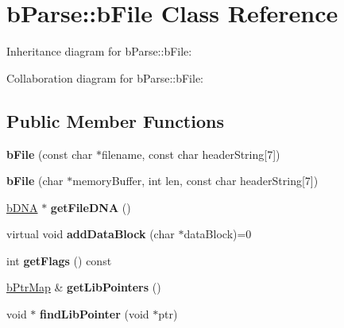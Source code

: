 \hypertarget{classb_parse_1_1b_file}{\section{b\+Parse\+:\+:b\+File Class Reference}
\label{classb_parse_1_1b_file}
}


Inheritance diagram for b\+Parse\+:\+:b\+File\+:


Collaboration diagram for b\+Parse\+:\+:b\+File\+:
\subsection*{Public Member Functions}
\begin{DoxyCompactItemize}
\item 
\hypertarget{classb_parse_1_1b_file_a01b52b96559d09b6f485a2b6b30a7c35}{{\bfseries b\+File} (const char $\ast$filename, const char header\+String\mbox{[}7\mbox{]})}\label{classb_parse_1_1b_file_a01b52b96559d09b6f485a2b6b30a7c35}

\item 
\hypertarget{classb_parse_1_1b_file_a152c5119d0f19103820b67590367179c}{{\bfseries b\+File} (char $\ast$memory\+Buffer, int len, const char header\+String\mbox{[}7\mbox{]})}\label{classb_parse_1_1b_file_a152c5119d0f19103820b67590367179c}

\item 
\hypertarget{classb_parse_1_1b_file_ac452173b4b97b77a6557f1df03fe17c4}{\hyperlink{classb_parse_1_1b_d_n_a}{b\+D\+N\+A} $\ast$ {\bfseries get\+File\+D\+N\+A} ()}\label{classb_parse_1_1b_file_ac452173b4b97b77a6557f1df03fe17c4}

\item 
\hypertarget{classb_parse_1_1b_file_a20874bc488319e12f6f35ae4a912900b}{virtual void {\bfseries add\+Data\+Block} (char $\ast$data\+Block)=0}\label{classb_parse_1_1b_file_a20874bc488319e12f6f35ae4a912900b}

\item 
\hypertarget{classb_parse_1_1b_file_a02d2b991e11791c26c394f1812d30cb7}{int {\bfseries get\+Flags} () const }\label{classb_parse_1_1b_file_a02d2b991e11791c26c394f1812d30cb7}

\item 
\hypertarget{classb_parse_1_1b_file_af57165d68bfb0faad353ae0f3d64b8e3}{\hyperlink{classbt_hash_map}{b\+Ptr\+Map} \& {\bfseries get\+Lib\+Pointers} ()}\label{classb_parse_1_1b_file_af57165d68bfb0faad353ae0f3d64b8e3}

\item 
\hypertarget{classb_parse_1_1b_file_ae87b7c44ec2198dad298e5434a9d89e3}{void $\ast$ {\bfseries find\+Lib\+Pointer} (void $\ast$ptr)}\label{classb_parse_1_1b_file_ae87b7c44ec2198dad298e5434a9d89e3}


\end{DoxyCompactItemize}

